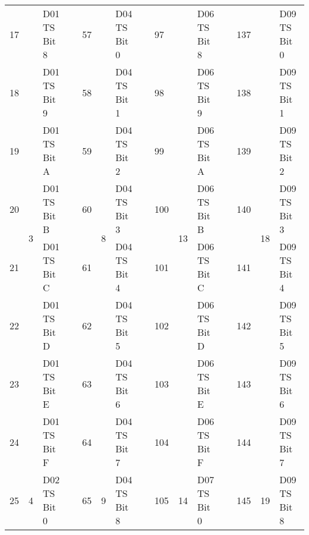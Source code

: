 \documentclass[]{article}
\begin{document}
\begin{landscape}
\begin{table}[]
\begin{tabular}{lllllllllllllll}
			17           & \multirow{8}{*}{3} & D01 TS Bit 8                  &                   & 57           & \multirow{8}{*}{8}  & D04 TS Bit 0      &  & 97           & \multirow{8}{*}{13} & D06 TS Bit 8      &  & 137          & \multirow{8}{*}{18} & D09 TS Bit 0      \\
			18           &                    & D01 TS Bit 9                  &                   & 58           &                     & D04 TS Bit 1      &  & 98           &                     & D06 TS Bit 9      &  & 138          &                     & D09 TS Bit 1      \\
			19           &                    & D01 TS Bit A                  &                   & 59           &                     & D04 TS Bit 2      &  & 99           &                     & D06 TS Bit A      &  & 139          &                     & D09 TS Bit 2      \\
			20           &                    & D01 TS Bit B                  &                   & 60           &                     & D04 TS Bit 3      &  & 100          &                     & D06 TS Bit B      &  & 140          &                     & D09 TS Bit 3      \\
			21           &                    & D01 TS Bit C                  &                   & 61           &                     & D04 TS Bit 4      &  & 101          &                     & D06 TS Bit C      &  & 141          &                     & D09 TS Bit 4      \\
			22           &                    & D01 TS Bit D                  &                   & 62           &                     & D04 TS Bit 5      &  & 102          &                     & D06 TS Bit D      &  & 142          &                     & D09 TS Bit 5      \\
			23           &                    & D01 TS Bit E                  &                   & 63           &                     & D04 TS Bit 6      &  & 103          &                     & D06 TS Bit E      &  & 143          &                     & D09 TS Bit 6      \\
			24           &                    & D01 TS Bit F                  &                   & 64           &                     & D04 TS Bit 7      &  & 104          &                     & D06 TS Bit F      &  & 144          &                     & D09 TS Bit 7      \\ \cline{1-3} \cline{5-7} \cline{9-11} \cline{13-15} 
			25           & \multirow{8}{*}{4} & D02 TS Bit 0                  &                   & 65           & \multirow{8}{*}{9}  & D04 TS Bit 8      &  & 105          & \multirow{8}{*}{14} & D07 TS Bit 0      &  & 145          & \multirow{8}{*}{19} & D09 TS Bit 8      \\

\end{tabular}
\end{table}
\end{landscape}
\end{document}
